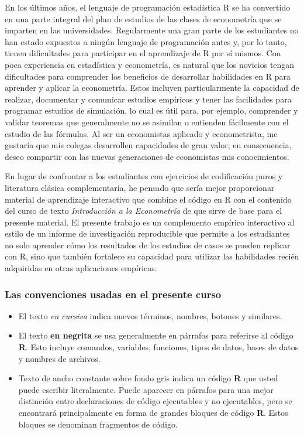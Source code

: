 \documentclass[
]{book}
\begin{document}
En los últimos años, el lenguaje de programación estadística R se ha convertido en una parte integral del plan de estudios de las clases de econometría que se imparten en las universidades. Regularmente una gran parte de los estudiantes no han estado expuestos a ningún lenguaje de programación antes y, por lo tanto, tienen dificultades para participar en el aprendizaje de R por sí mismos. Con poca experiencia en estadística y econometría, es natural que los novicios tengan dificultades para comprender los beneficios de desarrollar habilidades en R para aprender y aplicar la econometría. Estos incluyen particularmente la capacidad de realizar, documentar y comunicar estudios empíricos y tener las facilidades para programar estudios de simulación, lo cual es útil para, por ejemplo, comprender y validar teoremas que generalmente no se asimilan o entienden fácilmente con el estudio de las fórmulas. Al ser un economistas aplicado y econometrista, me gustaría que mis colegas desarrollen capacidades de gran valor; en consecuencia, deseo compartir con las nuevas generaciones de economistas mis conocimientos.

En lugar de confrontar a los estudiantes con ejercicios de codificación puros y literatura clásica complementaria, he pensado que sería mejor proporcionar material de aprendizaje interactivo que combine el código en R con el contenido del curso de texto \emph{Introducción a la Econometría} de \citet{stock2015} que sirve de base para el presente material. El presente trabajo es un complemento empírico interactivo al estilo de un informe de investigación reproducible que permite a los estudiantes no solo aprender cómo los resultados de los estudios de casos se pueden replicar con R, sino que también fortalece su capacidad para utilizar las habilidades recién adquiridas en otras aplicaciones empíricas.

\hypertarget{las-convenciones-usadas-en-el-presente-curso}{%
\subsubsection*{Las convenciones usadas en el presente curso}\label{las-convenciones-usadas-en-el-presente-curso}}

\begin{itemize}
\item
  El texto \emph{en cursiva} indica nuevos términos, nombres, botones y similares.
\item
  El texto \textbf{en negrita} se usa generalmente en párrafos para referirse al código \textbf{R}. Esto incluye comandos, variables, funciones, tipos de datos, bases de datos y nombres de archivos.
\item
  Texto de ancho constante sobre fondo gris indica un código \textbf{R} que usted puede escribir literalmente. Puede aparecer en párrafos para una mejor distinción entre declaraciones de código ejecutables y no ejecutables, pero se encontrará principalmente en forma de grandes bloques de código \textbf{R}. Estos bloques se denominan fragmentos de código.
\end{itemize}
\end{document}

